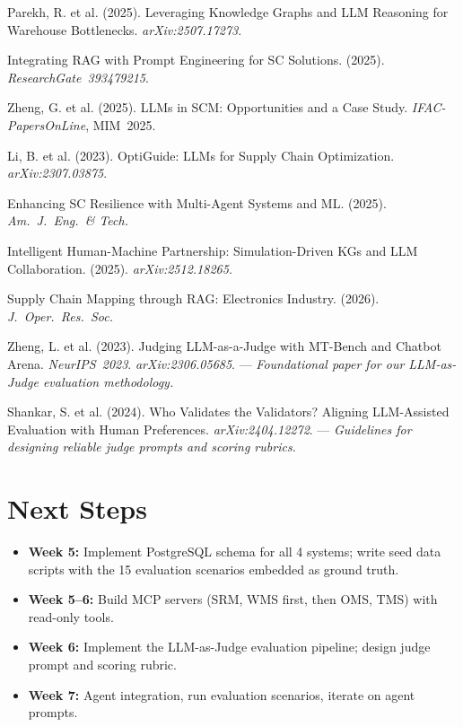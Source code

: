 \documentclass[11pt,a4paper]{article}
\begin{document}
\begin{enumerate}[leftmargin=2em, itemsep=0.3em, label={[\arabic*]}]
    \item Parekh, R. et al. (2025). Leveraging Knowledge Graphs and LLM Reasoning for Warehouse Bottlenecks. \textit{arXiv:2507.17273}.

    \item Integrating RAG with Prompt Engineering for SC Solutions. (2025). \textit{ResearchGate~393479215}.

    \item Zheng, G. et al. (2025). LLMs in SCM: Opportunities and a Case Study. \textit{IFAC-PapersOnLine}, MIM~2025.

    \item Li, B. et al. (2023). OptiGuide: LLMs for Supply Chain Optimization. \textit{arXiv:2307.03875}.

    \item Enhancing SC Resilience with Multi-Agent Systems and ML. (2025). \textit{Am.\ J.\ Eng.\ \& Tech.}

    \item Intelligent Human-Machine Partnership: Simulation-Driven KGs and LLM Collaboration. (2025). \textit{arXiv:2512.18265}.

    \item Supply Chain Mapping through RAG: Electronics Industry. (2026). \textit{J.\ Oper.\ Res.\ Soc.}

    \item[{[15]*}] Zheng, L. et al. (2023). Judging LLM-as-a-Judge with MT-Bench and Chatbot Arena. \textit{NeurIPS~2023}. \textit{arXiv:2306.05685}. --- \textit{Foundational paper for our LLM-as-Judge evaluation methodology.}

    \item[{[16]*}] Shankar, S. et al. (2024). Who Validates the Validators? Aligning LLM-Assisted Evaluation with Human Preferences. \textit{arXiv:2404.12272}. --- \textit{Guidelines for designing reliable judge prompts and scoring rubrics.}
\end{enumerate}
\renewcommand{\arraystretch}{1.0}

\section{Next Steps}

\begin{itemize}[itemsep=0.6em]
    \item \textbf{Week 5:} Implement PostgreSQL schema for all 4 systems; write seed data scripts with the 15 evaluation scenarios embedded as ground truth.
    \item \textbf{Week 5--6:} Build MCP servers (SRM, WMS first, then OMS, TMS) with read-only tools.
    \item \textbf{Week 6:} Implement the LLM-as-Judge evaluation pipeline; design judge prompt and scoring rubric.
    \item \textbf{Week 7:} Agent integration, run evaluation scenarios, iterate on agent prompts.
\end{itemize}
\end{document}
